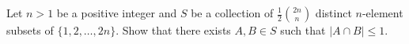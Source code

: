 Let $n > 1$ be a positive integer and $S$ be a collection of $\frac{1}{2}\binom{2n}{n}$ distinct $n$-element subsets of $\{1, 2, \dotsc, 2n\}$. Show that there exists $A, B\in S$ such that $|A\cap B|\leq 1$.